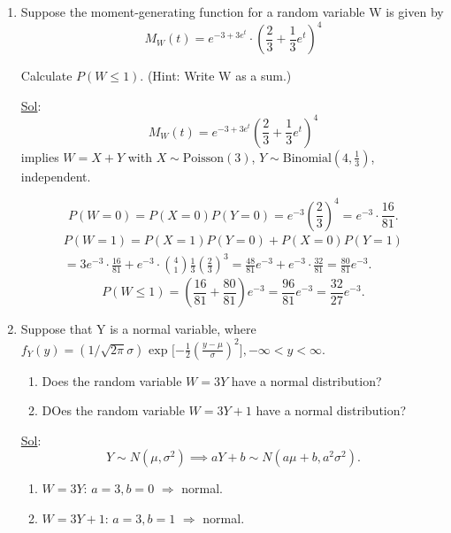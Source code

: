\begin{enumerate}
	\item[22.] Suppose the moment-generating function for a random variable W is given by
	      \[
		      M_W (t) = e^{-3 + 3e^t} \cdot (\frac{2}{3} + \frac{1}{3} e^t)^4
	      \]

	      Calculate \(P(W \leq 1).\) (Hint: Write W as a sum.)

	      \underline{Sol}: \\

	      \[
		      M_W(t)=e^{-3+3e^t}\left(\frac{2}{3}+\frac{1}{3}e^t\right)^4
	      \]
	      implies \(W = X + Y\) with \(X\sim\text{Poisson}(3)\), \(Y\sim\text{Binomial}(4,\frac13)\), independent.

	      \[
		      P(W=0)=P(X=0)P(Y=0)=e^{-3}\left(\frac{2}{3}\right)^4 = e^{-3}\cdot\frac{16}{81}.
	      \]
	      \[
		      \begin{aligned}
			      P(W=1)=P(X=1)P(Y=0)+P(X=0)P(Y=1) \\
			      =3e^{-3}\cdot\frac{16}{81}+e^{-3}\cdot\binom{4}{1}\frac13\left(\frac23\right)^3
			      = \frac{48}{81}e^{-3} + e^{-3}\cdot\frac{32}{81}= \frac{80}{81}e^{-3}.
		      \end{aligned}
	      \]
	      \[
		      P(W\le 1)=\left(\frac{16}{81}+\frac{80}{81}\right)e^{-3}= \frac{96}{81}e^{-3}= \frac{32}{27}e^{-3}.
	      \]

	\item[24.] Suppose that Y is a normal variable, where \(f_Y (y) = (1 / \sqrt{2 \pi} \sigma) \textrm{ exp } \lbrack - \frac{1}{2} (\frac{y - \mu}{\sigma})^2 \rbrack, - \infty < y < \infty\).
	      \begin{enumerate}
		      \item Does the random variable \(W = 3Y\) have a normal distribution?
		      \item DOes the random variable \(W = 3Y + 1\) have a normal distribution?
	      \end{enumerate}

	      \underline{Sol}: \\

	      \[
		      Y \sim N(\mu,\sigma^2) \implies aY+b \sim N(a\mu+b, a^2\sigma^2).
	      \]
	      \begin{enumerate}
		      \item \(W=3Y\): \(a=3,b=0\) \(\Rightarrow\) normal.
		      \item \(W=3Y+1\): \(a=3,b=1\) \(\Rightarrow\) normal.
	      \end{enumerate}
\end{enumerate}
